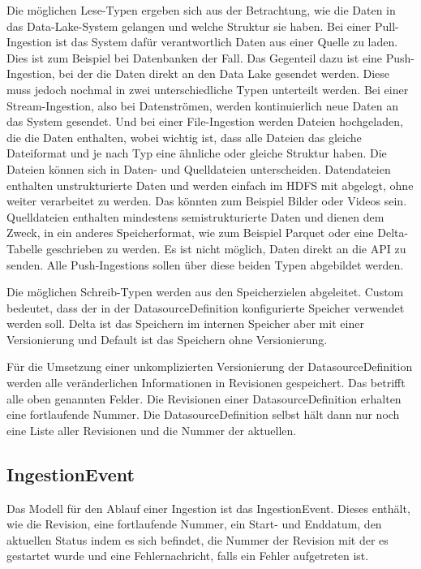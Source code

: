 Die möglichen Lese-Typen ergeben sich aus der Betrachtung, wie die Daten in das Data-Lake-System gelangen und welche Struktur sie haben.
Bei einer Pull-Ingestion ist das System dafür verantwortlich Daten aus einer Quelle zu laden.
Dies ist zum Beispiel bei Datenbanken der Fall.
Das Gegenteil dazu ist eine Push-Ingestion, bei der die Daten direkt an den Data Lake gesendet werden.
Diese muss jedoch nochmal in zwei unterschiedliche Typen unterteilt werden.
Bei einer Stream-Ingestion, also bei Datenströmen, werden kontinuierlich neue Daten an das System gesendet.
Und bei einer File-Ingestion werden Dateien hochgeladen, die die Daten enthalten, wobei wichtig ist, dass alle Dateien das gleiche Dateiformat und je nach Typ eine ähnliche oder gleiche Struktur haben.
Die Dateien können sich in Daten- und Quelldateien unterscheiden.
Datendateien enthalten unstrukturierte Daten und werden einfach im HDFS mit abgelegt, ohne weiter verarbeitet zu werden.
Das könnten zum Beispiel Bilder oder Videos sein.
Quelldateien enthalten mindestens semistrukturierte Daten und dienen dem Zweck, in ein anderes Speicherformat, wie zum Beispiel Parquet oder eine Delta-Tabelle geschrieben zu werden.
Es ist nicht möglich, Daten direkt an die API zu senden.
Alle Push-Ingestions sollen über diese beiden Typen abgebildet werden.

Die möglichen Schreib-Typen werden aus den Speicherzielen abgeleitet.
Custom bedeutet, dass der in der DatasourceDefinition konfigurierte Speicher verwendet werden soll.
Delta ist das Speichern im internen Speicher aber mit einer Versionierung und Default ist das Speichern ohne Versionierung.

Für die Umsetzung einer unkomplizierten Versionierung der DatasourceDefinition werden alle veränderlichen Informationen in Revisionen gespeichert.
Das betrifft alle oben genannten Felder.
Die Revisionen einer DatasourceDefinition erhalten eine fortlaufende Nummer.
Die DatasourceDefinition selbst hält dann nur noch eine Liste aller Revisionen und die Nummer der aktuellen.

\subsection{IngestionEvent}

Das Modell für den Ablauf einer Ingestion ist das IngestionEvent.
Dieses enthält, wie die Revision, eine fortlaufende Nummer, ein Start- und Enddatum, den aktuellen Status indem es sich befindet, die Nummer der Revision mit der es gestartet wurde und eine Fehlernachricht, falls ein Fehler aufgetreten ist.

